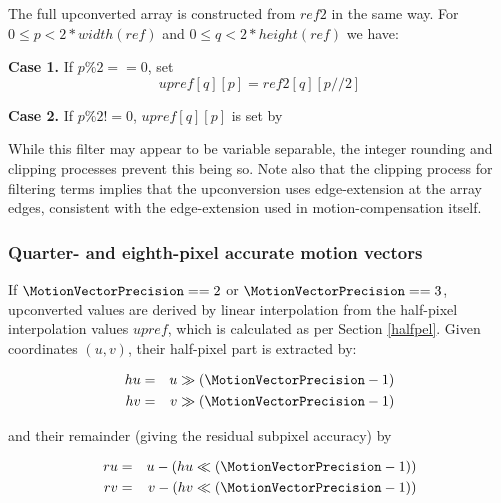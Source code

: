 The full upconverted array is constructed from $ref2$ in the same way.
 For $0\leq p<2*width(ref)$ and $0\leq q<2*height(ref)$ we have:

{\bf Case 1.} If $p\%2==0$, set
\begin{equation*}
upref[q][p]=ref2[q][p//2]
\end{equation*}

{\bf Case 2.} If $p\%2!=0$, $upref[q][p]$ is set by

\begin{pseudo*}
\end{pseudo*}

\begin{informative}
While this filter may appear to be variable separable, the integer rounding and 
clipping processes prevent this being so. Note also that the clipping process for
filtering terms implies that the upconversion uses edge-extension at the array
edges, consistent with the edge-extension used in motion-compensation itself.
\end{informative}

\subsubsection{Quarter- and eighth-pixel accurate motion vectors}

If $\MotionVectorPrecision==2$ or $\MotionVectorPrecision==3$, upconverted values are derived by linear
interpolation from the half-pixel interpolation values $upref$, which is calculated as 
per Section \ref{halfpel}. Given coordinates $(u,v)$, their half-pixel part
is extracted by:

\begin{eqnarray*}
hu & = & u \gg (\MotionVectorPrecision-1) \\
hv & = & v \gg (\MotionVectorPrecision-1) 
\end{eqnarray*}

and their remainder (giving the residual subpixel accuracy) by

\begin{eqnarray*}
ru & = & u-(hu\ll (\MotionVectorPrecision-1)) \\
rv & = & v-(hv\ll (\MotionVectorPrecision-1)) 
\end{eqnarray*}

